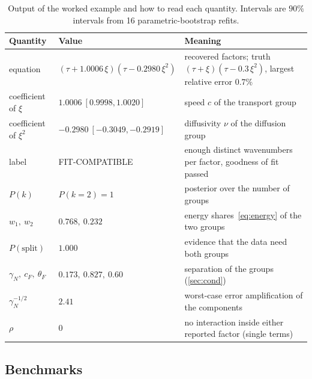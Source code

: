 \documentclass[11pt]{article}
\theoremstyle{plain}
\theoremstyle{definition}
\theoremstyle{remark}
\newcommand{\cF}{c_{F}}                     %
\newcommand{\thetaF}{\theta_{F}}            %
\newcommand{\gN}{\gamma_{N}}                %
\newcommand{\lab}[1]{\textsf{#1}}           %
\newcommand{\FC}{\lab{FIT-COMPATIBLE}}
\begin{document}
\begin{table}[tbp]
\centering\small
\caption{Output of the worked example and how to read each quantity. Intervals are $90\%$ intervals
from 16 parametric-bootstrap refits.}\label{tab:worked}
\begin{tabularx}{\linewidth}{@{}l l X@{}}
\toprule
Quantity & Value & Meaning\\
\midrule
equation & $(\tau+1.0006\,\xi)(\tau-0.2980\,\xi^2)$ & recovered factors; truth $(\tau+\xi)(\tau-0.3\,\xi^2)$, largest relative error $0.7\%$\\
coefficient of $\xi$ & $1.0006\ [0.9998,1.0020]$ & speed $c$ of the transport group\\
coefficient of $\xi^2$ & $-0.2980\ [-0.3049,-0.2919]$ & diffusivity $\nu$ of the diffusion group\\
label & \FC & enough distinct wavenumbers per factor, goodness of fit passed\\
$P(k)$ & $P(k=2)=1$ & posterior over the number of groups\\
$w_1,\ w_2$ & $0.768,\ 0.232$ & energy shares~\eqref{eq:energy} of the two groups\\
$P(\text{split})$ & $1.000$ & evidence that the data need both groups\\
$\gN,\ \cF,\ \thetaF$ & $0.173,\ 0.827,\ 0.60$ & separation of the groups (\cref{sec:cond})\\
$\gN^{-1/2}$ & $2.41$ & worst-case error amplification of the components\\
$\rho$ & $0$ & no interaction inside either reported factor (single terms)\\
\bottomrule
\end{tabularx}
\end{table}



\subsection{Benchmarks}\label{sec:bench}
\end{document}
